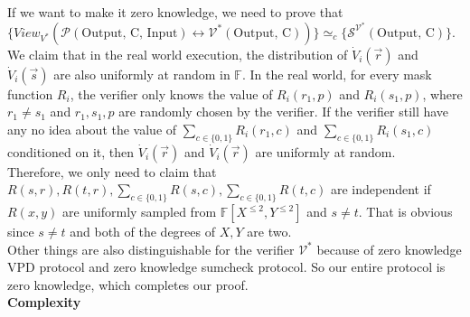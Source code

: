 If we want to make it zero knowledge, we need to prove that $\{View_{V^*}(\mathcal{P}(\text{Output, C, Input}) \leftrightarrow \mathcal{V^*}(\text{Output, C}))\} \simeq_{c} \{\mathcal{S}^{\mathcal{V^*}}(\text{Output, C})\}$. We claim that in the real world execution, the distribution of $\dot{V}_i(\vec{r})$ and $\dot{V}_i(\vec{s})$ are also uniformly at random in $\mathbb{F}$. In the real world, for every mask function $R_i$, the verifier only knows the value of $R_i(r_1, p)$ and $R_i(s_1, p)$, where $r_1 \neq s_1$ and $r_1, s_1, p$ are randomly chosen by the verifier. If the verifier still have any no idea about the value of $\sum\limits_{c \in \{0, 1\}}R_i(r_1, c)$ and $\sum\limits_{c \in \{0, 1\}}R_i(s_1, c)$ conditioned on it, then $\dot{V}_i(\vec{r})$ and $\dot{V}_i(\vec{r})$ are uniformly at random.\\

Therefore, we only need to claim that $R(s, r), R(t, r), \sum\limits_{c \in \{0, 1\}}R(s, c), \sum\limits_{c \in \{0, 1\}}R(t, c)$ are independent if $R(x, y)$ are uniformly sampled from $\mathbb{F}[X^{\leqslant 2}, Y^{\leqslant 2}]$ and $s \neq t$. That is obvious since $s \neq t$ and both of the degrees of $X, Y$ are two. \\

Other things are also distinguishable for the verifier $\mathcal{V^*}$ because of zero knowledge VPD protocol and zero knowledge sumcheck protocol. So our entire protocol is zero knowledge, which completes our proof.\\

\noindent
\textbf{Complexity}



















